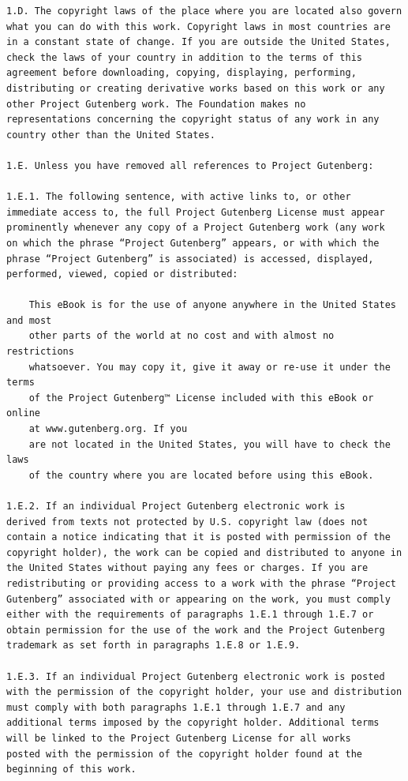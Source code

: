 \documentclass{article}
\begin{document}
\begin{verbatim}
1.D. The copyright laws of the place where you are located also govern
what you can do with this work. Copyright laws in most countries are
in a constant state of change. If you are outside the United States,
check the laws of your country in addition to the terms of this
agreement before downloading, copying, displaying, performing,
distributing or creating derivative works based on this work or any
other Project Gutenberg work. The Foundation makes no
representations concerning the copyright status of any work in any
country other than the United States.

1.E. Unless you have removed all references to Project Gutenberg:

1.E.1. The following sentence, with active links to, or other
immediate access to, the full Project Gutenberg License must appear
prominently whenever any copy of a Project Gutenberg work (any work
on which the phrase “Project Gutenberg” appears, or with which the
phrase “Project Gutenberg” is associated) is accessed, displayed,
performed, viewed, copied or distributed:

    This eBook is for the use of anyone anywhere in the United States and most
    other parts of the world at no cost and with almost no restrictions
    whatsoever. You may copy it, give it away or re-use it under the terms
    of the Project Gutenberg™ License included with this eBook or online
    at www.gutenberg.org. If you
    are not located in the United States, you will have to check the laws
    of the country where you are located before using this eBook.

1.E.2. If an individual Project Gutenberg electronic work is
derived from texts not protected by U.S. copyright law (does not
contain a notice indicating that it is posted with permission of the
copyright holder), the work can be copied and distributed to anyone in
the United States without paying any fees or charges. If you are
redistributing or providing access to a work with the phrase “Project
Gutenberg” associated with or appearing on the work, you must comply
either with the requirements of paragraphs 1.E.1 through 1.E.7 or
obtain permission for the use of the work and the Project Gutenberg
trademark as set forth in paragraphs 1.E.8 or 1.E.9.

1.E.3. If an individual Project Gutenberg electronic work is posted
with the permission of the copyright holder, your use and distribution
must comply with both paragraphs 1.E.1 through 1.E.7 and any
additional terms imposed by the copyright holder. Additional terms
will be linked to the Project Gutenberg License for all works
posted with the permission of the copyright holder found at the
beginning of this work.


\end{verbatim}
\end{document}
